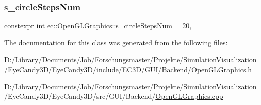 \mbox{\label{classec_1_1_open_g_l_graphics_a311d856061bbc1ee99d1b2e2c1c524a4}} 
\subsubsection{\texorpdfstring{s\+\_\+circle\+Steps\+Num}{s\_circleStepsNum}}
{\footnotesize\ttfamily constexpr int ec\+::\+Open\+G\+L\+Graphics\+::s\+\_\+circle\+Steps\+Num = 20\hspace{0.3cm}{\ttfamily [static]}, {\ttfamily [protected]}}



The documentation for this class was generated from the following files\+:\begin{DoxyCompactItemize}
\item 
D\+:/\+Library/\+Documents/\+Job/\+Forschungsmaster/\+Projekte/\+Simulation\+Visualization/\+Eye\+Candy3\+D/\+Eye\+Candy3\+D/include/\+E\+C3\+D/\+G\+U\+I/\+Backend/\mbox{\hyperlink{_open_g_l_graphics_8h}{Open\+G\+L\+Graphics.\+h}}\item 
D\+:/\+Library/\+Documents/\+Job/\+Forschungsmaster/\+Projekte/\+Simulation\+Visualization/\+Eye\+Candy3\+D/\+Eye\+Candy3\+D/src/\+G\+U\+I/\+Backend/\mbox{\hyperlink{_open_g_l_graphics_8cpp}{Open\+G\+L\+Graphics.\+cpp}}\end{DoxyCompactItemize}
